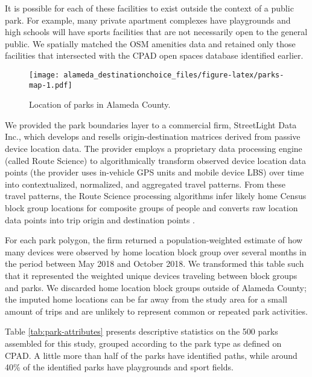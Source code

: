 \documentclass[3p, authoryear]{elsarticle} %
\makeatletter
\def\maxwidth{\ifdim\Gin@nat@width>\linewidth\linewidth
\else\Gin@nat@width\fi}
\let\Oldincludegraphics\includegraphics
\renewcommand{\includegraphics}[1]{\Oldincludegraphics[width=\maxwidth]{#1}}
\makeatother
\begin{document}
It is possible for each of these facilities to exist outside the context of
a public park. For example, many private apartment complexes have playgrounds
and high schools will have sports facilities that are not necessarily open to
the general public. We spatially matched the OSM amenities data and retained
only those facilities that intersected with the CPAD open spaces database
identified earlier.

\begin{figure}
\centering
\texttt{[image: alameda\_destinationchoice\_files/figure-latex/parks-map-1.pdf]}
\caption{\label{fig:parks-map}Location of parks in Alameda County.}
\end{figure}

We provided the park boundaries layer to a commercial firm, StreetLight Data
Inc., which develops and resells origin-destination matrices derived from
passive device location data. The provider employs a proprietary data processing
engine (called Route Science) to algorithmically transform observed device
location data points (the provider uses in-vehicle GPS units and mobile device
LBS) over time into contextualized, normalized, and aggregated travel patterns.
From these travel patterns, the Route Science processing algorithms infer likely
home Census block group locations for composite groups of people and converts
raw location data points into trip origin and destination points \citep{Pan2006, Friedrich2010}.

For each park polygon, the firm returned a population-weighted estimate of how
many devices were observed by home location block group over several months in
the period between May 2018 and October 2018. We transformed this table such
that it represented the weighted unique devices traveling between block groups
and parks. We discarded home location block groups outside of Alameda County;
the imputed home locations can be far away from the study area for a small
amount of trips and are unlikely to represent common or repeated park
activities.

Table \ref{tab:park-attributes} presents descriptive statistics
on the 500 parks assembled for this study, grouped according to the
park type as defined on CPAD. A little more than half of the parks have
identified paths, while around 40\% of the identified parks have playgrounds and
sport fields.
\end{document}
